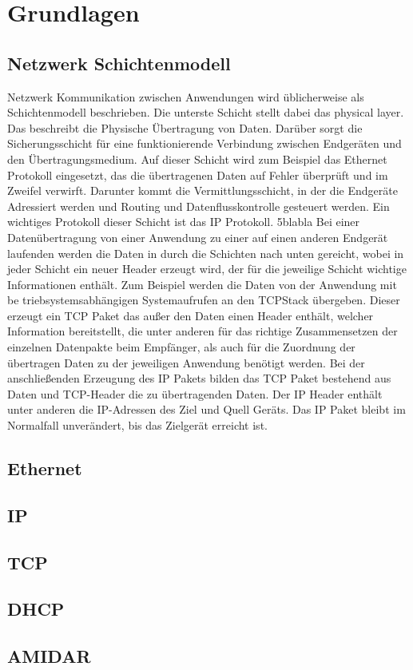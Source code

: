\chapter{Grundlagen}

\section{Netzwerk Schichtenmodell}
Netzwerk Kommunikation zwischen Anwendungen wird üblicherweise als Schichtenmodell beschrieben.  
Die unterste Schicht stellt dabei das physical layer. Das beschreibt die Physische Übertragung von Daten. 
Darüber sorgt die Sicherungsschicht für eine funktionierende Verbindung zwischen Endgeräten und den Übertragungsmedium. Auf dieser Schicht wird zum Beispiel das Ethernet Protokoll eingesetzt, das die übertragenen Daten auf Fehler überprüft und im Zweifel verwirft. 
Darunter kommt die Vermittlungsschicht, in der die Endgeräte Adressiert werden und Routing und Datenflusskontrolle gesteuert werden. Ein wichtiges Protokoll dieser Schicht ist das IP Protokoll.
5blabla
Bei einer Datenübertragung von einer Anwendung zu einer auf einen anderen Endgerät laufenden werden die Daten in durch die Schichten nach unten gereicht, wobei in jeder Schicht ein neuer Header erzeugt wird, der für die jeweilige Schicht wichtige Informationen enthält. Zum Beispiel werden die Daten von der Anwendung mit be 
triebsystemsabhängigen Systemaufrufen an den TCPStack übergeben. Dieser erzeugt ein TCP Paket das außer den Daten einen Header enthält, welcher Information bereitstellt, die unter anderen für das richtige Zusammensetzen der einzelnen Datenpakte beim Empfänger, als auch für die Zuordnung der übertragen Daten zu der jeweiligen Anwendung benötigt werden. Bei der anschließenden Erzeugung des IP Pakets bilden das TCP Paket bestehend aus Daten und TCP-Header die zu übertragenden Daten. Der IP Header enthält unter anderen die IP-Adressen des Ziel und Quell Geräts. Das IP Paket bleibt im Normalfall unverändert, bis das Zielgerät erreicht ist. 

\section{Ethernet}
\section{IP}
\section{TCP}
\section{DHCP}
\section{AMIDAR}
